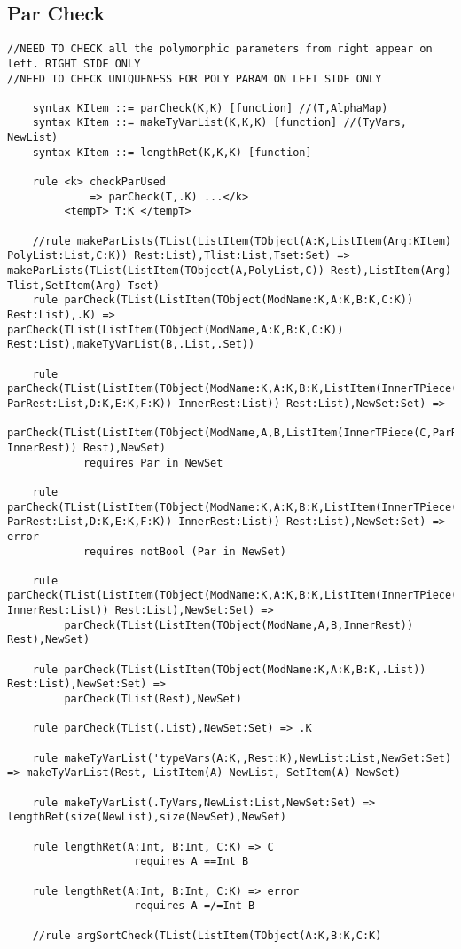 \subsection{Par Check}
\begin{lstlisting}
//NEED TO CHECK all the polymorphic parameters from right appear on left. RIGHT SIDE ONLY
//NEED TO CHECK UNIQUENESS FOR POLY PARAM ON LEFT SIDE ONLY

    syntax KItem ::= parCheck(K,K) [function] //(T,AlphaMap)
    syntax KItem ::= makeTyVarList(K,K,K) [function] //(TyVars, NewList)
    syntax KItem ::= lengthRet(K,K,K) [function]

    rule <k> checkParUsed
             => parCheck(T,.K) ...</k>
         <tempT> T:K </tempT>

    //rule makeParLists(TList(ListItem(TObject(A:K,ListItem(Arg:KItem) PolyList:List,C:K)) Rest:List),Tlist:List,Tset:Set) => makeParLists(TList(ListItem(TObject(A,PolyList,C)) Rest),ListItem(Arg) Tlist,SetItem(Arg) Tset)
    rule parCheck(TList(ListItem(TObject(ModName:K,A:K,B:K,C:K)) Rest:List),.K) => parCheck(TList(ListItem(TObject(ModName,A:K,B:K,C:K)) Rest:List),makeTyVarList(B,.List,.Set))

    rule parCheck(TList(ListItem(TObject(ModName:K,A:K,B:K,ListItem(InnerTPiece(C:K,ListItem(Par:KItem) ParRest:List,D:K,E:K,F:K)) InnerRest:List)) Rest:List),NewSet:Set) =>
         parCheck(TList(ListItem(TObject(ModName,A,B,ListItem(InnerTPiece(C,ParRest,D,E,F)) InnerRest)) Rest),NewSet)
            requires Par in NewSet

    rule parCheck(TList(ListItem(TObject(ModName:K,A:K,B:K,ListItem(InnerTPiece(C:K,ListItem(Par:KItem) ParRest:List,D:K,E:K,F:K)) InnerRest:List)) Rest:List),NewSet:Set) => error
            requires notBool (Par in NewSet)

    rule parCheck(TList(ListItem(TObject(ModName:K,A:K,B:K,ListItem(InnerTPiece(C:K,.List,D:K,E:K,F:K)) InnerRest:List)) Rest:List),NewSet:Set) =>
         parCheck(TList(ListItem(TObject(ModName,A,B,InnerRest)) Rest),NewSet)

    rule parCheck(TList(ListItem(TObject(ModName:K,A:K,B:K,.List)) Rest:List),NewSet:Set) =>
         parCheck(TList(Rest),NewSet)

    rule parCheck(TList(.List),NewSet:Set) => .K

    rule makeTyVarList('typeVars(A:K,,Rest:K),NewList:List,NewSet:Set) => makeTyVarList(Rest, ListItem(A) NewList, SetItem(A) NewSet)

    rule makeTyVarList(.TyVars,NewList:List,NewSet:Set) => lengthRet(size(NewList),size(NewSet),NewSet)

    rule lengthRet(A:Int, B:Int, C:K) => C
                    requires A ==Int B

    rule lengthRet(A:Int, B:Int, C:K) => error
                    requires A =/=Int B
    
    //rule argSortCheck(TList(ListItem(TObject(A:K,B:K,C:K)
\end{lstlisting}